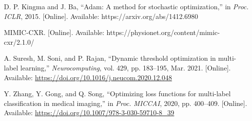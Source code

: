 \documentclass[12pt]{article}
\begin{document}
\begin{thebibliography}{99}
D. P. Kingma and J. Ba, “Adam: A method for stochastic optimization,” in \textit{Proc. ICLR}, 2015. [Online]. Available: https://arxiv.org/abs/1412.6980

MIMIC-CXR. [Online]. Available: https://physionet.org/content/mimic-cxr/2.1.0/

A. Suresh, M. Soni, and P. Rajan, “Dynamic threshold optimization in multi-label learning,” \textit{Neurocomputing}, vol. 429, pp. 183–195, Mar. 2021. [Online]. Available: \url{https://doi.org/10.1016/j.neucom.2020.12.048}

Y. Zhang, Y. Gong, and Q. Song, “Optimizing loss functions for multi-label classification in medical imaging,” in \textit{Proc. MICCAI}, 2020, pp. 400–409. [Online]. Available: \url{https://doi.org/10.1007/978-3-030-59710-8_39}

\end{thebibliography}
\end{document}

